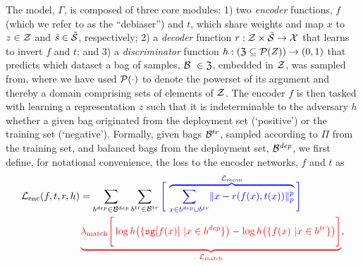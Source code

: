 The model, \(\Gamma\), is composed of three core modules: 
1) two \emph{encoder} functions, $f$ (which we refer to
as the ``debiaser'') and $t$, which share weights and map $x$ to $z \in {\mathcal{Z}}$ and
$\tilde{s} \in \tilde{{\mathcal{S}}}$, respectively;
2) a \emph{decoder} function \(r: {\mathcal{Z}} \times \tilde{{\mathcal{S}}} \to {\mathcal{X}}\) that learns to
invert $f$ and $t$; and
3) a \emph{discriminator} function \( h: (\mathfrak{Z} \subseteq {\mathcal{P}}(Z)) \to ( 0, 1 ) \) that
predicts which dataset a bag of samples, \({\mathcal{B}}\ \in \mathfrak{Z}\), embedded in ${\mathcal{Z}}$, was sampled
from, where we have used \( {\mathcal{P}}(\cdot) \) to denote the powerset of its argument and thereby a
domain comprising sets of elements of \({\mathcal{Z}}\).
%
The encoder $f$ is then tasked with learning a representation $z$ such that it is indeterminable to
the adversary $h$ whether a given bag originated from the deployment set (`positive') or the
training set (`negative').
Formally, given bags
\( {\mathcal{B}}^{tr} \), sampled according to \(\Pi\) from the training set, and balanced bags from the deployment
set, \( {\mathcal{B}}^\mathit{dep} \), we first define, for notational convenience, the loss \wrt{} to the
encoder networks, $f$ and $t$ as
%
\begin{align}
&{\mathcal{L}}_\text{enc}(f, t, r, h) = 
  \sum_{b^{dep} \in {\mathcal{B}}^{dep}}
  \sum_{b^{tr} \in {\mathcal{B}}^{tr}} 
\textcolor{blue}{
  \Bigg[\,
    \overbrace{
    \sum_{x \in b^{dep} \cup b^{tr}} 
      \lVert x - r(f(x), t(x))\rVert_p^p}^{{\mathcal{L}}_{\text{recon}}}
    \Bigg]
    }
    \nonumber\\
   &\quad\quad\quad\quad\quad\quad
   \textcolor{red}{
     \underbrace{ \lambda_\text{match}  \Bigg[
       \log h \bigl( \{ \texttt{sg}[f(x)]\ | x \in b^\mathit{dep} \} \bigr) 
       - \log h \bigl( \{ f(x)\ | x \in b^\mathit{tr} \} \bigr) 
 \Bigg] }_{{\mathcal{L}}_{\text{match}}}
},
\label{eq:disentangling}
\end{align}
